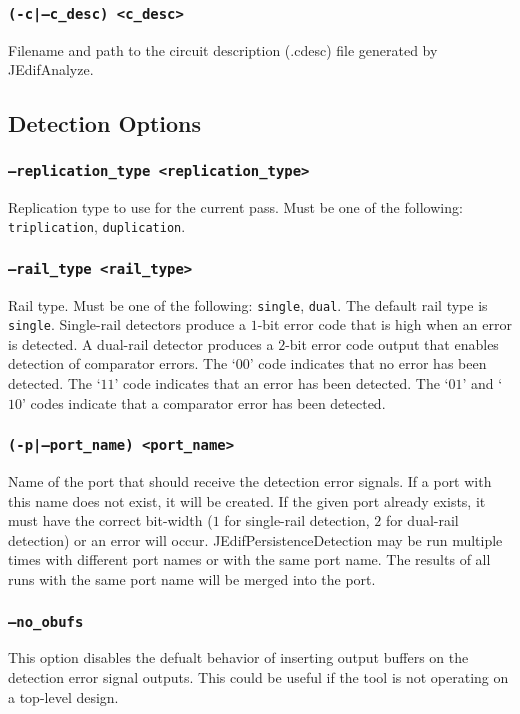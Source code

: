 \subsubsection{\texttt{(-c|--c\_desc) <c\_desc>}}
Filename and path to the circuit description (.cdesc) file generated by
JEdifAnalyze.


\subsection{Detection Options}

\subsubsection{\texttt{--replication\_type <replication\_type>}}
Replication type to use for the current pass. Must be one of the following:
\texttt{triplication}, \texttt{duplication}.

\subsubsection{\texttt{--rail\_type <rail\_type>}}
Rail type. Must be one of the following: \texttt{single}, \texttt{dual}. The
default rail type is \texttt{single}. Single-rail detectors produce a $1$-bit
error code that is high when an error is detected. A dual-rail detector produces
a $2$-bit error code output that enables detection of comparator errors. The
`\texttt{$00$}' code indicates that no error has been detected. The
`\texttt{$11$}' code indicates that an error has been detected. The
`\texttt{$01$}' and `\texttt{$10$}' codes indicate that a comparator error has
been detected.

\subsubsection{\texttt{(-p|--port\_name) <port\_name>}}
Name of the port that should receive the detection error signals. If a port
with this name does not exist, it will be created. If the given port already
exists, it must have the correct bit-width ($1$ for single-rail detection, $2$
for dual-rail detection) or an error will occur. JEdifPersistenceDetection may
be run multiple times with different port names or with the same port name.
The results of all runs with the same port name will be merged into the port.

\subsubsection{\texttt{--no\_obufs}}
This option disables the defualt behavior of inserting output buffers on the
detection error signal outputs. This could be useful if the tool is not
operating on a top-level design.

